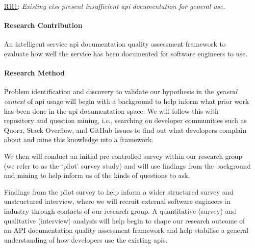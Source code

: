\begin{titled-frame}{\underline{RH1}: \textit{Existing \glspl{cis} present insufficient \gls{api} documentation for general use.} }
\paragraph{Research Contribution} An intelligent service \gls{api} documentation quality assessment framework to evaluate how well the service has been documented for software engineers to use.

\paragraph{Research Method}

Problem identification and discovery to validate our hypothesis in the \textit{general context} of \gls{api} usage will begin with a background to help inform what prior work has been done in the \gls{api} documentation space. We will follow this with repository and question mining, i.e., searching on developer communities such as Quora, Stack Overflow, and GitHub Issues to find out what developers complain about and mine this knowledge into a framework.

We then will conduct an initial pre-controlled survey within our research group (we refer to as the `pilot' survey study) and will use findings from the background and mining to help inform us of the kinds of questions to ask. 

Findings from the pilot survey to help inform a wider structured survey and unstructured interview, where we will recruit external software engineers in industry through contacts of our research group. A quantitative (survey) and qualitative (interview) analysis will help begin to shape our research outcome of an API documentation quality assessment framework and help stabilise a general understanding of how developers use the existing \glspl{api}.
\end{titled-frame}

